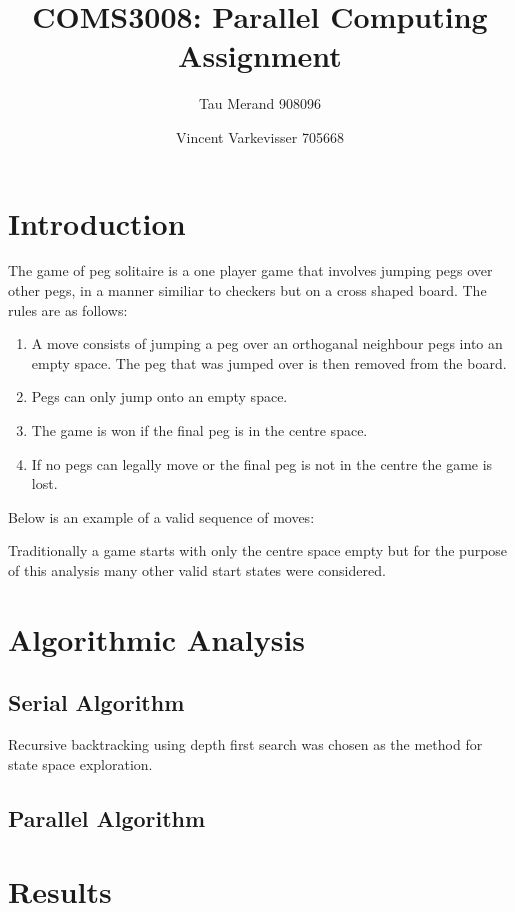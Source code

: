 \documentclass[12pt,a4paper]{report}
\begin{document}
\parindent0pt

\title{COMS3008: Parallel Computing Assignment}
\author{Tau Merand 908096 \and Vincent Varkevisser 705668}
\maketitle
\section*{Introduction}
The game of peg solitaire is a one player game that involves jumping pegs over other pegs, in a manner similiar to checkers but on a cross shaped board. The rules are as follows:
\begin{enumerate}
  \item A move consists of jumping a peg over an orthoganal neighbour pegs into an empty space. The peg that was jumped over is then removed from the board.
  \item Pegs can only jump onto an empty space.
  \item The game is won if the final peg is in the centre space.
  \item If no pegs can legally move or the final peg is not in the centre the game is lost.
\end{enumerate}
Below is an example of a valid sequence of moves:

Traditionally a game starts with only the centre space empty but for the purpose of this analysis many other valid start states were considered.
\section*{Algorithmic Analysis}
\subsection*{Serial Algorithm}
Recursive backtracking using depth first search was chosen as the method for state space exploration.

\subsection*{Parallel Algorithm}

\section*{Results}
\end{document}
